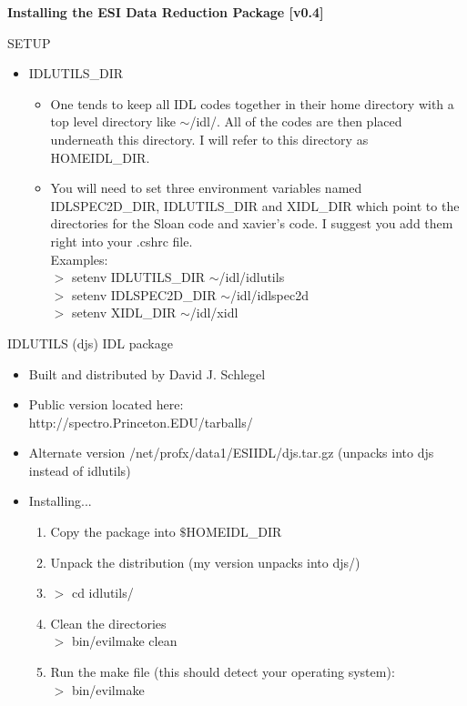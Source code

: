 \documentclass[11pt,letterpaper,dvips]{article}
\begin{document}
 

\begin{center}
{{\huge \bf Installing the ESI Data Reduction Package [v0.4]}}
\end{center}

\begin{enumerate}

{\Large   \item SETUP}
   \begin{itemize}
	\item IDLUTILS\_DIR
	\begin{itemize}
	  \item One tends to keep all IDL codes together in their home directory
		with a top level directory like $\sim$/idl/.  All of the codes
		are then placed underneath this directory.  I will refer to 
		this directory as HOMEIDL\_DIR.
	  \item You will need to set three environment variables 
	  named IDLSPEC2D\_DIR, IDLUTILS\_DIR and 
  	  XIDL\_DIR which point to the directories
	  for the Sloan code and xavier's code.  I suggest you add them
	  right into your .cshrc file. \\
	  \quad Examples: \\
	  \quad $>$ setenv IDLUTILS\_DIR $\sim$/idl/idlutils \\
	  \quad $>$ setenv IDLSPEC2D\_DIR $\sim$/idl/idlspec2d \\
	  \quad $>$ setenv XIDL\_DIR $\sim$/idl/xidl 
	\end{itemize}
   \end{itemize}
	

{\Large   \item IDLUTILS (djs) IDL package}
   \begin{itemize}
	\item Built and distributed by David J. Schlegel
	\item Public version located here: \\
	http://spectro.Princeton.EDU/tarballs/
	\item Alternate version /net/profx/data1/ESIIDL/djs.tar.gz (unpacks
	  into djs instead of idlutils)
	\item Installing...
	\begin{enumerate}
	  \item Copy the package into $\$$HOMEIDL\_DIR
	  \item Unpack the distribution (my version unpacks into djs/)
	  \item $>$ cd idlutils/
	  \item Clean the directories \\
	  $>$ bin/evilmake clean
	  \item Run the make file (this should detect your operating system):  \\
	  $>$ bin/evilmake
	\end{enumerate}
   \end{itemize}


\end{enumerate}
\end{document}
